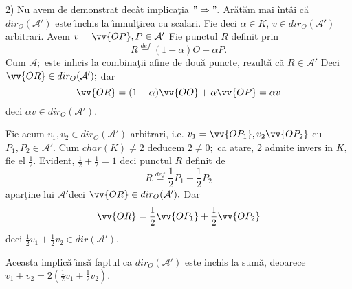 \documentclass[12pt]{book}
\def\Ac{\mathcal A}
\def\defq{\stackrel{def}{=}}
\begin{document}
2) Nu avem de demonstrat dec\^at implica\c tia $"\Rightarrow".$ Ar\u at\u am mai \^int\^ai c\u a $dir_O(\Ac')$ este \^{\i}nchis la \^{\i}nmul\c tirea cu scalari. Fie deci $\alpha\in K$, $v\in dir_O(\Ac')$ arbitrari.
Avem $v=\vv{OP}, P\in \Ac'$ Fie punctul $R$ definit prin
$$R\defq(1-\alpha)O+\alpha P.$$
Cum $\Ac;$ este inhcis la combina\c tii afine de dou\u a puncte, rezult\u a c\u a  $R\in \Ac'$ Deci $\vv{OR}\in dir_O(\Ac');$ dar
$$\vv{OR}=(1-\alpha)\vv{OO}+\alpha \vv{OP}=\alpha v$$
deci $\alpha v\in dir_O(\Ac').$

Fie acum $v_1, v_2\in dir_O(\Ac')$ arbitrari, i.e. $v_1=\vv{OP_1}, v_2\vv{OP_2}$ cu $P_1, P_2\in \Ac'.$
Cum $char(K)\not=2$ deducem $2\not=0;$ ca atare, $2$ admite invers in $K,$ fie el $\frac{1}{2}.$
Evident, $\frac{1}{2}+\frac{1}{2}=1$ deci punctul $R$ definit de
$$R\defq \frac{1}{2}P_1+\frac{1}{2}P_2$$ 
apar\c tine lui $\Ac'$deci $\vv{OR}\in dir_O(\Ac').$
Dar
$$\vv{OR}=\frac{1}{2}\vv{OP_1}+\frac{1}{2}\vv{OP_2}$$
deci $\frac{1}{2}{v_1}+\frac{1}{2}v_2\in dir(\Ac').$

Aceasta implic\u a \^{\i}ns\u a faptul ca $dir_O(\Ac')$ este inchis la sum\u a, deoarece
$v_1+v_2=2(\frac{1}{2}v_1+\frac{1}{2}v_2).$
\end{document}
